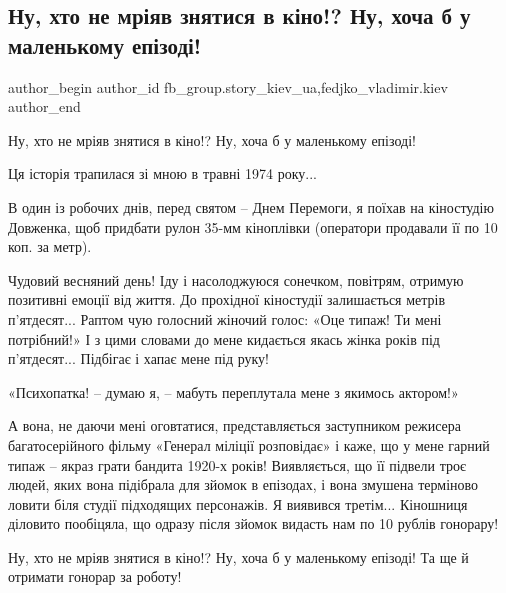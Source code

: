  
 
 
 
 
 
\subsection{Ну, хто не мріяв знятися в кіно!? Ну, хоча б у маленькому епізоді!}
\label{sec:17_11_2021.fb.fb_group.story_kiev_ua.1.kino}
 
\ifcmt
 author_begin
   author_id fb_group.story_kiev_ua,fedjko_vladimir.kiev
 author_end
\fi

Ну, хто не мріяв знятися в кіно!? Ну, хоча б у маленькому епізоді! 

Ця історія трапилася зі мною в травні 1974 року...

В один із робочих днів, перед святом – Днем Перемоги, я поїхав на кіностудію
Довженка, щоб придбати рулон 35-мм кіноплівки (оператори продавали її по 10
коп. за метр).

Чудовий весняний день! Іду і насолоджуюся сонечком, повітрям, отримую позитивні
емоції від життя. До прохідної кіностудії залишається метрів п’ятдесят... Раптом
чую голосний жіночий голос: «Оце типаж! Ти мені потрібний!» І з цими словами до
мене кидається якась жінка років під п’ятдесят... Підбігає і хапає мене під руку!

«Психопатка! – думаю я, – мабуть переплутала мене з якимось актором!»

А вона, не даючи мені оговтатися, представляється заступником режисера
багатосерійного фільму «Генерал міліції розповідає» і каже, що у мене гарний
типаж – якраз грати бандита 1920-х років! Виявляється, що її підвели троє
людей, яких вона підібрала для зйомок в епізодах, і вона змушена терміново
ловити біля студії підходящих персонажів. Я виявився третім... Кіношниця діловито
пообіцяла, що одразу після зйомок видасть нам по 10 рублів гонорару!

Ну, хто не мріяв знятися в кіно!? Ну, хоча б у маленькому епізоді! Та ще й
отримати гонорар за роботу!

